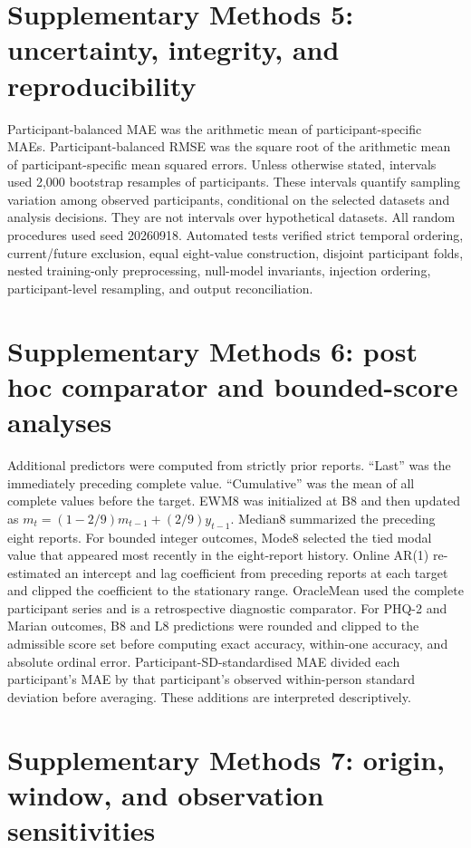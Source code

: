 \documentclass[pdflatex,sn-vancouver-num]{sn-jnl}
\begin{document}
\section{Supplementary Methods 5: uncertainty, integrity, and reproducibility}

Participant-balanced MAE was the arithmetic mean of participant-specific MAEs. Participant-balanced RMSE was the square root of the arithmetic mean of participant-specific mean squared errors. Unless otherwise stated, intervals used 2,000 bootstrap resamples of participants. These intervals quantify sampling variation among observed participants, conditional on the selected datasets and analysis decisions. They are not intervals over hypothetical datasets. All random procedures used seed 20260918. Automated tests verified strict temporal ordering, current/future exclusion, equal eight-value construction, disjoint participant folds, nested training-only preprocessing, null-model invariants, injection ordering, participant-level resampling, and output reconciliation.

\section{Supplementary Methods 6: post hoc comparator and bounded-score analyses}

Additional predictors were computed from strictly prior reports. ``Last'' was the immediately preceding complete value. ``Cumulative'' was the mean of all complete values before the target. EWM8 was initialized at B8 and then updated as $m_t=(1-2/9)m_{t-1}+(2/9)y_{t-1}$. Median8 summarized the preceding eight reports. For bounded integer outcomes, Mode8 selected the tied modal value that appeared most recently in the eight-report history. Online AR(1) re-estimated an intercept and lag coefficient from preceding reports at each target and clipped the coefficient to the stationary range. OracleMean used the complete participant series and is a retrospective diagnostic comparator. For PHQ-2 and Marian outcomes, B8 and L8 predictions were rounded and clipped to the admissible score set before computing exact accuracy, within-one accuracy, and absolute ordinal error. Participant-SD-standardised MAE divided each participant's MAE by that participant's observed within-person standard deviation before averaging. These additions are interpreted descriptively.

\section{Supplementary Methods 7: origin, window, and observation sensitivities}
\end{document}
